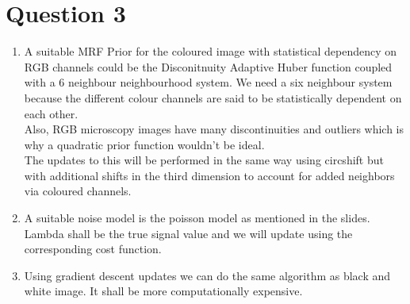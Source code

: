 \documentclass[12pt]{article}
\theoremstyle{definition}
\numberwithin{thm}{section}
\begin{document}
\section{Question 3}
\begin{enumerate}[label=(\alph*)]
\item A suitable MRF Prior for the coloured image with statistical dependency on RGB channels could be the Disconitnuity Adaptive Huber function coupled with a 6 neighbour neighbourhood system. We need a six neighbour system because the different colour channels are said to be statistically dependent on each other. \\
Also, RGB microscopy images have many discontinuities and outliers which is why a quadratic prior function wouldn't be ideal. \\
The updates to this will be performed in the same way using circshift but with additional shifts in the third dimension to account for added neighbors via coloured channels.
\item A suitable noise model is the poisson model as mentioned in the slides. Lambda shall be the true signal value and we will update using the corresponding cost function.
\item Using gradient descent updates we can do the same algorithm as black and white image. It shall be more computationally expensive. 
\end{enumerate}
\end{document}
